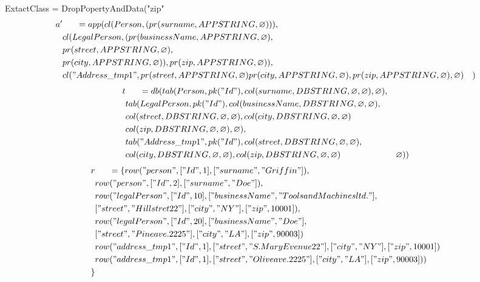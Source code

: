 \documentclass[11pt]{article}
\begin{document}
\newpage
ExtactClass = DropPopertyAndData("zip"
\begin{align*}
a' & \;\;\;\;\;\; =app(cl(Person, (pr(surname, APPSTRING, \varnothing))), \\
& cl(LegalPerson, (pr(businessName, APPSTRING, \varnothing), \\
& pr(street, APPSTRING, \varnothing), \\
& pr(city, APPSTRING, \varnothing)), pr(zip, APPSTRING, \varnothing)), \\
& cl("Address\_tmp1", pr(street, APPSTRING, \varnothing) pr(city, APPSTRING, \varnothing), pr(zip, APPSTRING, \varnothing), \varnothing)
& )
\end{align*}
\begin{align*}
t & \;\;\;\;\;\; =db(tab(Person, pk("Id"), col(surname, DBSTRING, \varnothing, \varnothing), \varnothing), \\
& tab(LegalPerson, pk("Id"),  col(businessName, DBSTRING, \varnothing, \varnothing), \\
& col(street, DBSTRING, \varnothing, \varnothing), col(city, DBSTRING, \varnothing, \varnothing) \\
& col(zip, DBSTRING, \varnothing, \varnothing), \varnothing), \\
& tab("Address\_tmp1", pk("Id"), col(street, DBSTRING, \varnothing, \varnothing),\\
& col(city, DBSTRING, \varnothing, \varnothing), col(zip, DBSTRING, \varnothing, \varnothing)
& \varnothing)) 
\end{align*}
\begin{align*}
r & \;\;\;\;\;\; =\{ row("person", ["Id", 1], ["surname", "Griffin"]), \\
& row("person", ["Id", 2], ["surname", "Doe"]), \\
& row("legalPerson", ["Id", 10], ["businessName", "Tools and Machines ltd."], \\
& ["street", "Hill stret 22"], ["city", "NY"], ["zip", 10001]), \\
& row("legalPerson", ["Id", 20], ["businessName", "Doe"], \\
& ["street", "Pine ave. 2225"], ["city", "LA"], ["zip", 90003])\\
& row("address\_tmp1", ["Id", 1], ["street", "S. Mary Evenue 22"], ["city", "NY"], ["zip", 10001]) \\
& row("address\_tmp1", ["Id", 1], ["street", "Olive ave. 2225"], ["city", "LA"], ["zip", 90003]) )\\
\}
\end{align*}
\end{document}
